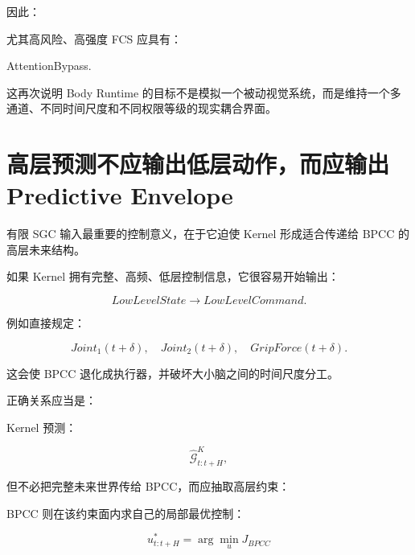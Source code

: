 因此：

\begin{statementbox}
\centering
{}
\end{statementbox}

尤其高风险、高强度 FCS 应具有：

\begin{statementbox}
AttentionBypass.
\end{statementbox}

这再次说明 Body Runtime 的目标不是模拟一个被动视觉系统，而是维持一个多通道、不同时间尺度和不同权限等级的现实耦合界面。

\section{高层预测不应输出低层动作，而应输出Predictive Envelope}

有限 SGC 输入最重要的控制意义，在于它迫使 Kernel 形成适合传递给 BPCC 的高层未来结构。

如果 Kernel 拥有完整、高频、低层控制信息，它很容易开始输出：

\[
LowLevelState
\rightarrow
LowLevelCommand.
\]

例如直接规定：

\[
Joint_1(t+\delta),
\quad
Joint_2(t+\delta),
\quad
GripForce(t+\delta).
\]

这会使 BPCC 退化成执行器，并破坏大小脑之间的时间尺度分工。

正确关系应当是：

\begin{statementbox}
\centering
{}
\end{statementbox}

Kernel 预测：

\[
\hat{\mathcal G}_{t:t+H}^{K},
\]

但不必把完整未来世界传给 BPCC，而应抽取高层约束：

\begin{statementbox}
\centering
{}
\end{statementbox}

BPCC 则在该约束面内求自己的局部最优控制：

\[
u_{t:t+H}^{*}
=
\arg\min_{u}
J_{BPCC}
\]

